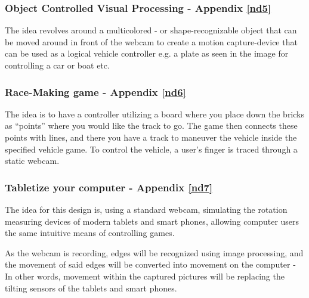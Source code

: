 \subsubsection{Object Controlled Visual Processing - Appendix \ref{nd5}}
The idea revolves around a multicolored - or shape-recognizable object that can be moved around in front of the webcam to create a motion capture-device that can be used as a logical vehicle controller e.g. a plate as seen in the image for controlling a car or boat etc.

\subsubsection{Race-Making game - Appendix \ref{nd6}}
The idea is to have a controller utilizing a board where you place down the bricks as “points” where you would like the track to go. The game then connects these points with lines, and there you have a track to maneuver the vehicle inside the specified vehicle game. To control the vehicle, a user’s finger is traced through a static webcam.

\subsubsection{Tabletize your computer - Appendix \ref{nd7}}
The idea for this design is, using a standard webcam, simulating the rotation measuring devices of modern tablets and smart phones, allowing computer users the same intuitive means of controlling games.

As the webcam is recording, edges will be recognized using image processing, and the movement of said edges will be converted into movement on the computer - In other words, movement within the captured pictures will be replacing the tilting sensors of the tablets and smart phones.

